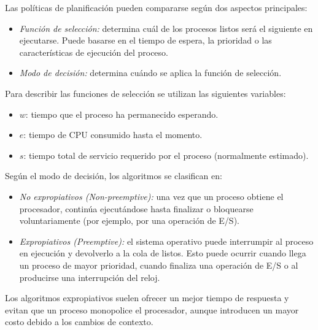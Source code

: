 Las políticas de planificación pueden compararse según dos aspectos principales:
\begin{itemize}
  \item \textit{Función de selección:} determina cuál de los procesos listos será el siguiente en ejecutarse. Puede basarse en el tiempo de espera, la prioridad o las características de ejecución del proceso.
  \item \textit{Modo de decisión:} determina cuándo se aplica la función de selección.
\end{itemize}
Para describir las funciones de selección se utilizan las siguientes variables:
\begin{itemize}
  \item \(w\): tiempo que el proceso ha permanecido esperando.
  \item \(e\): tiempo de CPU consumido hasta el momento.
  \item \(s\): tiempo total de servicio requerido por el proceso (normalmente estimado).
\end{itemize}
Según el modo de decisión, los algoritmos se clasifican en:
\begin{itemize}
  \item \textit{No expropiativos (\textit{Non-preemptive}):} una vez que un proceso obtiene el procesador, continúa ejecutándose hasta finalizar o bloquearse voluntariamente (por ejemplo, por una operación de E/S).
  \item \textit{Expropiativos (\textit{Preemptive}):} el sistema operativo puede interrumpir al proceso en ejecución y devolverlo a la cola de listos. Esto puede ocurrir cuando llega un proceso de mayor prioridad, cuando finaliza una operación de E/S o al producirse una interrupción del reloj.
\end{itemize}
Los algoritmos expropiativos suelen ofrecer un mejor tiempo de respuesta y evitan que un proceso monopolice el procesador, aunque introducen un mayor costo debido a los cambios de contexto.

